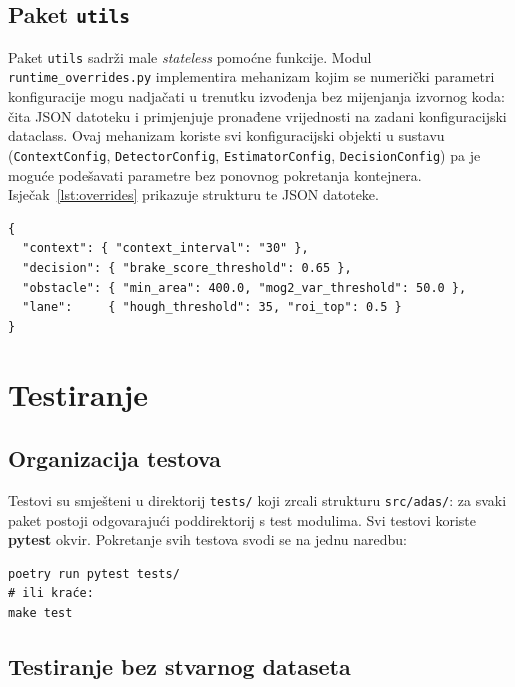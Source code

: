 \subsection{Paket \texttt{utils}}

Paket \texttt{utils} sadrži male \textit{stateless} pomoćne funkcije. Modul \texttt{runtime\_overrides.py} implementira mehanizam kojim se numerički parametri konfiguracije mogu nadjačati u trenutku izvođenja bez mijenjanja izvornog koda: čita JSON datoteku  i primjenjuje pronađene vrijednosti na zadani konfiguracijski dataclass. Ovaj mehanizam koriste svi konfiguracijski objekti u sustavu (\texttt{ContextConfig}, \texttt{DetectorConfig}, \texttt{EstimatorConfig}, \texttt{DecisionConfig}) pa je moguće podešavati parametre bez ponovnog pokretanja kontejnera. Isječak~\ref{lst:overrides} prikazuje strukturu te JSON datoteke.

\begin{lstlisting}[style=bashcode, caption={Primjer runtime\_overrides.json datoteke s nadjačanim parametrima}, label={lst:overrides}]
{
  "context": { "context_interval": "30" },
  "decision": { "brake_score_threshold": 0.65 },
  "obstacle": { "min_area": 400.0, "mog2_var_threshold": 50.0 },
  "lane":     { "hough_threshold": 35, "roi_top": 0.5 }
}
\end{lstlisting}

\section{Testiranje}

\subsection{Organizacija testova}

Testovi su smješteni u direktorij \texttt{tests/} koji zrcali strukturu \texttt{src/adas/}: za svaki paket postoji odgovarajući poddirektorij s test modulima. Svi testovi koriste \textbf{pytest} okvir. Pokretanje svih testova svodi se na jednu naredbu:

\begin{lstlisting}[style=bashcode, caption={Pokretanje testova}, label={lst:pytest}]
poetry run pytest tests/
# ili kraće:
make test
\end{lstlisting}

\subsection{Testiranje bez stvarnog dataseta}

